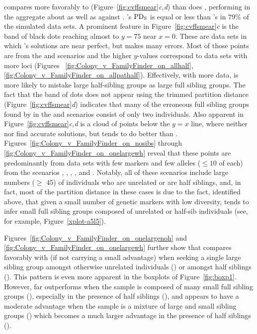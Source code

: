 \documentclass[11pt]{article}
\begin{document}
{\familyfinder{} compares more favorably to \colony{} (Figure~\ref{fig:cvffsmear}{\em c,d}) than does 
\kinalyzer{}, performing in the aggregate about as well as \prt{} against \colony{}. 
\colony{}'s $\mathrm{PD_S}$ is equal or less than \familyfinder{}'s in 79\% of the simulated data sets.
A prominent feature in Figure~\ref{fig:cvffsmear}{\em c} is the band of black dots reaching almost to 
$y=75$ near $x=0$.  These are data sets in which \colony{}'s solutions are near perfect, but 
\familyfinder{} makes many errors.  Most of those points are from the \allhalf{} and \allpathalf{} 
scenarios and the higher $y$-values correspond to data sets with more loci (Figures~
\ref{fig:Colony_v_FamilyFinder_on_allhalf}, \ref{fig:Colony_v_FamilyFinder_on_allpathalf}).  
Effectively, with more data, \familyfinder{} is more likely to mistake large half-sibling groups as 
large full sibling groups.  The fact that the band of dots does not appear using the trimmed partition 
distance (Figure~\ref{fig:cvffsmear}{\em d}) indicates that many of the erroneous full sibling groups 
found by \familyfinder{} in the \allhalf{} and \allpathalf{} scenarios consist of only two individuals.   
Also apparent in Figure~\ref{fig:cvffsmear}{\em c,d} is a cloud of points below the $y=x$ line, where 
neither \familyfinder{} nor \colony{} find accurate solutions, but \familyfinder{} tends to do better 
than \colony{}.  Figures~\ref{fig:Colony_v_FamilyFinder_on_nosibs} through 
\ref{fig:Colony_v_FamilyFinder_on_onelargewh} reveal that these points are predominantly from data sets 
with few markers and few alleles ($\leq 10$ of each) from the scenarios \allhalf{}, \allpathalf{}, 
\nosibs{}, \onelargenoh{}, and \onelargewh{}\@.  Notably, all of these scenarios include large numbers 
($\geq$ 45) of individuals who are unrelated or are half siblings, and, in fact, most of the partition 
distance in these cases is due to the fact, identified above, that given a small number of genetic 
markers with low diversity, \colony{} tends to infer small full sibling groups composed of unrelated or 
half-sib individuals (see, for example, Figure~\ref{xplot-a5l5}).  

Figures~\ref{fig:Colony_v_FamilyFinder_on_onelargenoh} and 
\ref{fig:Colony_v_FamilyFinder_on_onelargewh} further show that \familyfinder{} compares favorably with 
\colony{} (if not carrying a small advantage) when seeking a single large sibling group amongst 
otherwise unrelated individuals (\onelargenoh) or amongst half siblings (\onelargewh).  This pattern is 
even more apparent in the boxplots of Figure~\ref{fig:boxp1}.  However, \colony{} far outperforms 
\familyfinder{} when the sample is composed of many small full sibling groups (\sfsnoh), especially in 
the presence of half siblings (\sfswh), and \colony{} appears to have a moderate advantage when the 
sample is a mixture of large and small sibling groups (\slfsgnoh) which becomes a much larger advantage 
in the presence of half siblings (\slfsgwh).

}
\end{document}
